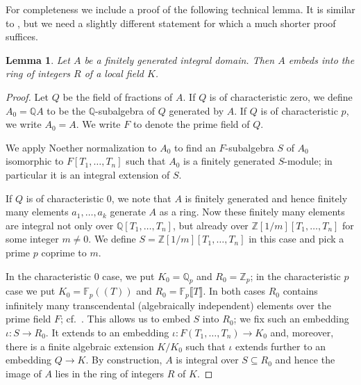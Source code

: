 \documentclass[a4paper,10pt]{amsart}
\theoremstyle{plain}
\newtheorem{lemma}[thm]{Lemma}
\theoremstyle{definition}
\newcommand{\bbQ}{\mathbb{Q}}
\newcommand{\bbF}{\mathbb{F}}
\newcommand{\bbZ}{\mathbb{Z}}
\numberwithin{equation}{section}
\begin{document}
For completeness we include a proof of the following technical lemma. It is similar to \cite[Lemma~2.1]{BG}, but we need a slightly different statement for which a much shorter proof suffices.%
\begin{lemma}\label{lem:embedding_local}
Let $A$ be a finitely generated integral domain. Then $A$ embeds into the ring of integers $R$ of a local field $K$.
\end{lemma}
\begin{proof}
Let $Q$ be the field of fractions of $A$.
If $Q$ is of characteristic zero, we define $A_0 = \bbQ A$ to be the $\bbQ$-subalgebra of $Q$ generated by $A$. If $Q$ is of characteristic $p$, we write $A_0 = A$. We write $F$ to denote the prime field of $Q$.

We apply Noether normalization \cite[p.~223]{Eisenbud} to $A_0$ to find an $F$-subalgebra $S$ of $A_0$ isomorphic to $F[T_1,\dots,T_n]$ such that $A_0$ is a finitely generated $S$-module; in particular it is an integral extension of $S$.

If $Q$ is of characteristic $0$, we note that $A$ is finitely generated and hence finitely many elements $a_1,\dots,a_k$ generate $A$ as a ring. Now these finitely many elements are integral not only over $\bbQ[T_1,\dots,T_n]$, but already over $\bbZ[1/m][T_1,\dots,T_n]$ for some integer $m \neq 0$.
We define $S =\bbZ[1/m][T_1,\dots,T_n]$ in this case and pick a prime $p$ coprime to $m$.

In the characteristic $0$ case, we put $K_0 = \bbQ_p$ and $R_0 = \bbZ_p$; in the characteristic $p$ case we put $K_0 = \bbF_p(\!(T)\!)$ and $R_0 =\bbF_p\llbracket T \rrbracket$. In both cases $R_0$ contains infinitely many transcendental (algebraically independent) elements over the prime field $F$; cf.~\cite[Lemma 3]{Cassels}. This allows us to embed $S$ into $R_0$; we fix such an embedding $\iota\colon S \to R_0$. It extends to an embedding $\iota\colon F(T_1,\dots,T_n) \to K_0$ and, moreover,
there is a finite algebraic extension $K/K_0$ such that $\iota$ extends further to an embedding $Q \to K$. By construction, $A$ is integral over $S \subseteq R_0$ and hence the image of $A$ lies in the ring of integers $R$ of $K$.
\end{proof}
\end{document}

